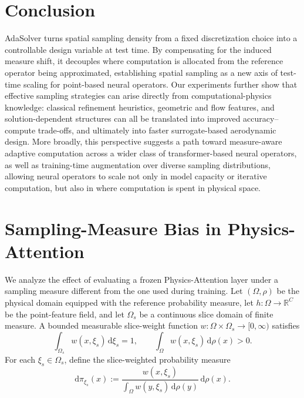 \documentclass{article}
\begin{document}
\section{Conclusion}
\label{sec:conclusion}
AdaSolver turns spatial sampling density from a fixed discretization choice into a controllable design variable at test time. By compensating for the induced measure shift, it decouples where computation is allocated from the reference operator being approximated, establishing spatial sampling as a new axis of test-time scaling for point-based neural operators. Our experiments further show that effective sampling strategies can arise directly from computational-physics knowledge: classical refinement heuristics, geometric and flow features, and solution-dependent structures can all be translated into improved accuracy–compute trade-offs, and ultimately into faster surrogate-based aerodynamic design. More broadly, this perspective suggests a path toward measure-aware adaptive computation across a wider class of transformer-based neural operators, as well as training-time augmentation over diverse sampling distributions, allowing neural operators to scale not only in model capacity or iterative computation, but also in where computation is spent in physical space.

\clearpage



\appendix
{}
\section{Sampling-Measure Bias in Physics-Attention}
\label{app:measure_shift_bias}

We analyze the effect of evaluating a frozen Physics-Attention layer under a sampling measure different from the one used during training. Let $(\Omega,\rho)$ be the physical domain equipped with the reference probability measure, let $h:\Omega\to\mathbb{R}^{C}$ be the point-feature field, and let $\Omega_s$ be a continuous slice domain of finite measure. A bounded measurable slice-weight function $w:\Omega\times\Omega_s\to[0,\infty)$ satisfies
\begin{equation}
    \int_{\Omega_s}w(x,\xi_s)\,\mathrm{d}\xi_s=1,
    \qquad
    \int_{\Omega}w(x,\xi_s)\,\mathrm{d}\rho(x)>0.
    \label{eq:app_continuous_slice_weights}
\end{equation}
For each $\xi_s\in\Omega_s$, define the slice-weighted probability measure
\begin{equation}
    \mathrm{d}\pi_{\xi_s}(x)
    :=\frac{w(x,\xi_s)}{\int_{\Omega}w(y,\xi_s)\,\mathrm{d}\rho(y)}
    \,\mathrm{d}\rho(x).
    \label{eq:app_slice_measure}
\end{equation}
\end{document}
